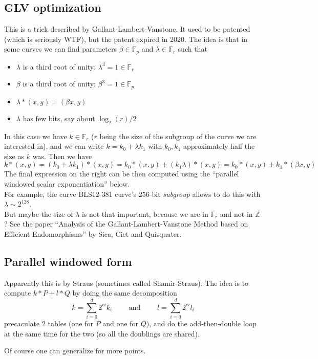 \documentclass[12pt,draft,a4paper,openany,oneside]{amsbook}
\def\F{\mathbb{F}}
\def\Z{\mathbb{Z}}
\theoremstyle{plain}
\theoremstyle{definition}
\begin{document}
\subsection{GLV optimization}
This is a trick described by Gallant-Lambert-Vanstone. It used to be
patented (which is seriously WTF), but the patent expired in 2020.
The idea is that in some curves we can find parameters
$\beta\in\F_p$ and $\lambda\in\F_r$ such that 
\begin{itemize}
\item $\lambda$ is a third root of unity: $\lambda^3 =1 \in\F_r$ 
\item $\beta$ is a third root of unity: $\beta^3=1\in \F_p$ 
\item $\lambda * (x,y) = (\beta x, y)$
\item $\lambda$ has few bits, say about $\log_2(r)/2$
\end{itemize}
In this case we have $k\in \F_r$ ($r$ being the size of the subgroup
of the curve we are interested in), and we can write $k = k_0 + \lambda k_1$
with $k_0,k_1$ approximately half the size as $k$ was.
Then we have
\[ k*(x,y) = (k_0 + \lambda k_1)*(x,y) = k_0*(x,y) + (k_1\lambda)*(x,y)
= k_0*(x,y) + k_1*(\beta x,y) 
\]
The final expression on the right can be then computed 
using the ``parallel windowed scalar exponentiation'' below.\\

For example, the curve BLS12-381 curve's 256-bit \emph{subgroup} allows to do this
with $\lambda\sim 2^{128}$.\\

But maybe the size of $\lambda$ is not that important, because
we are in $\F_r$ and not in $\Z$? See the paper
``Analysis of the Gallant-Lambert-Vanstone
Method based on Efficient Endomorphisms''
by Sica, Ciet and Quisquater.


\subsection{Parallel windowed form}
Apparently this is by Straus (sometimes called Shamir-Straus). The idea is to 
compute $k*P + l*Q$ by doing the same decomposition 
\[ k=\sum_{i=0}^d 2^{ci}k_i \quad\quad \textrm{ and } \quad\quad 
   l=\sum_{i=0}^d 2^{ci}l_i
\]
precaculate 2 tables (one for $P$ and one for $Q$), and do the add-then-double
loop at the same time for the two (so all the doublings are shared).

Of course one can generalize for more points.
\end{document}
